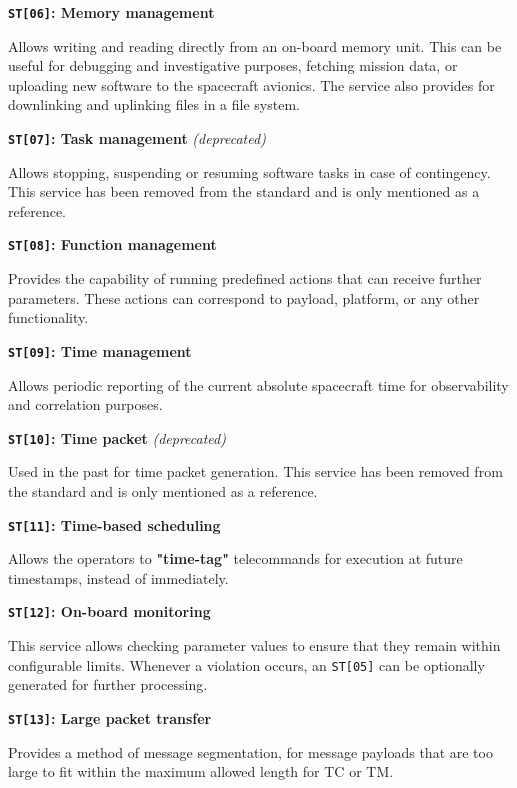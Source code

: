 \documentclass[a4paper,nobib]{tufte-book}
\begin{document}
\begin{compactitem}
	\item \textbf{\texttt{ST[06]}: Memory management}
	
	Allows writing and reading directly from an on-board memory unit. This can be useful for debugging and investigative purposes, fetching mission data, or uploading new software to the spacecraft avionics. The service also provides for downlinking and uplinking files in a file system.
	
	\item \textbf{\texttt{ST[07]}: Task management} \emph{(deprecated)}
	
	Allows stopping, suspending or resuming software tasks in case of contingency. This service has been removed from the standard and is only mentioned as a reference.
	
	\item \textbf{\texttt{ST[08]}: Function management}
	
	Provides the capability of running predefined actions that can receive further parameters. These actions can correspond to payload, platform, or any other functionality.
	
	\item \textbf{\texttt{ST[09]}: Time management}
	
	Allows periodic reporting of the current absolute spacecraft time for observability and correlation purposes.
	
	\item \textbf{\texttt{ST[10]}: Time packet} \emph{(deprecated)}
	
	Used in the past for time packet generation. This service has been removed from the standard and is only mentioned as a reference.
	
	\item \textbf{\texttt{ST[11]}: Time-based scheduling}
	
	Allows the operators to \textbf{"time-tag"} telecommands for execution at future timestamps, instead of immediately.
	
	\item \textbf{\texttt{ST[12]}: On-board monitoring}
	
	This service allows checking parameter values to ensure that they remain within configurable limits. Whenever a violation occurs, an \texttt{ST[05]} can be optionally generated for further processing.
	
	\item \textbf{\texttt{ST[13]}: Large packet transfer}
	
	Provides a method of message segmentation, for message payloads that are too large to fit within the maximum allowed length for \ac{TC} or \ac{TM}.
	

\end{compactitem}
\end{document}
